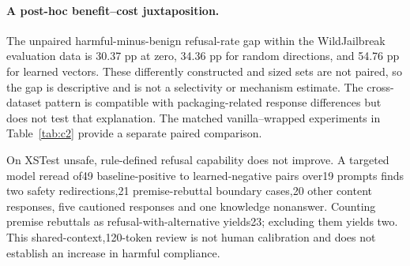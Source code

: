 \paragraph{A post-hoc benefit--cost juxtaposition.}

The unpaired harmful-minus-benign refusal-rate gap within the WildJailbreak evaluation data is 30.37 pp at zero, 34.36 pp for random directions, and 54.76 pp for learned vectors. These differently constructed and sized sets are not paired, so the gap is descriptive and is not a selectivity or mechanism estimate. The cross-dataset pattern is compatible with packaging-related response differences but does not test that explanation. The matched vanilla--wrapped experiments in Table~\ref{tab:c2} provide a separate paired comparison.

On XSTest unsafe, rule-defined refusal capability does not improve. A targeted model reread of49 baseline-positive to learned-negative pairs over19 prompts finds two safety redirections,21 premise-rebuttal boundary cases,20 other content responses, five cautioned responses and one knowledge nonanswer. Counting premise rebuttals as refusal-with-alternative yields23; excluding them yields two. This shared-context,120-token review is not human calibration and does not establish an increase in harmful compliance.
